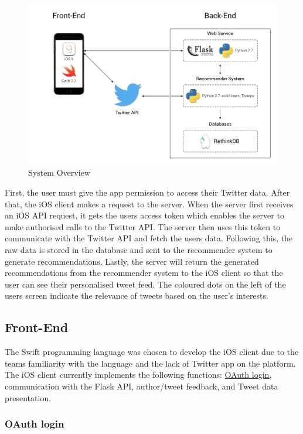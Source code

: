 \documentclass{article}
\begin{document}
\begin{figure}[H] 
    \centering
    \includegraphics[width=\textwidth]{system_overview}  
    \caption{System Overview}
\end{figure}

First, the user must give the app permission to access their Twitter data. After that, the iOS client makes a request to the server. When the server first receives an iOS API request, it gets the users access token which enables the server to make authorised calls to the Twitter API. The server then uses this token to communicate with the Twitter API and fetch the users data. Following this, the raw data is stored in the database and sent to the recommender system to generate recommendations. 
Lastly, the server will return the generated recommendations from the recommender system to the iOS client so that the user can see their personalised tweet feed. The coloured dots on the left of the users screen indicate the relevance of tweets based on the user's interests.


\subsection{Front-End} 

The Swift programming language was chosen to develop the iOS client due to the teams familiarity with the language and the lack of Twitter app on the platform. The iOS client currently implements the following functions: \hyperlink{oauth}{OAuth login}, communication with the Flask API, author/tweet feedback, and Tweet data presentation.

\subsubsection*{OAuth login} 
\end{document}

